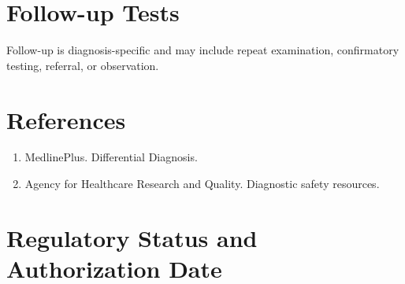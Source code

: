 \section*{Follow-up Tests} Follow-up is diagnosis-specific and may include repeat examination, confirmatory testing, referral, or observation.
\section*{References} \begin{enumerate}\item MedlinePlus. Differential Diagnosis.\item Agency for Healthcare Research and Quality. Diagnostic safety resources.\end{enumerate}
\clearpage\section*{Regulatory Status and Authorization Date}\clearpage

